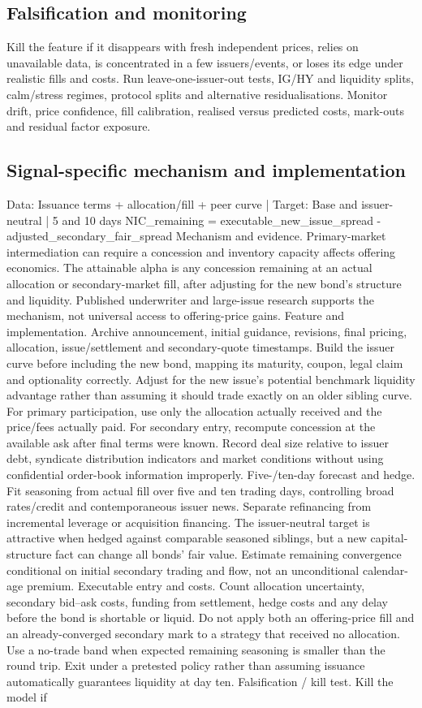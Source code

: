 \documentclass[10pt]{article}
\begin{document}
\subsection{Falsification and monitoring}
Kill the feature if it disappears with fresh independent prices, relies on unavailable data, is concentrated in a few issuers/events, or loses its edge under realistic fills and costs. Run leave-one-issuer-out tests, IG/HY and liquidity splits, calm/stress regimes, protocol splits and alternative residualisations. Monitor drift, price confidence, fill calibration, realised versus predicted costs, mark-outs and residual factor exposure.
\subsection{Signal-specific mechanism and implementation}
Data: Issuance terms + allocation/fill + peer curve  |  Target: Base and issuer-neutral  |  5 and 10 days NIC\_remaining = executable\_new\_issue\_spread - adjusted\_secondary\_fair\_spread Mechanism and evidence.  Primary-market intermediation can require a concession and inventory capacity affects offering economics. The attainable alpha is any concession remaining at an actual allocation or secondary-market fill, after adjusting for the new bond’s structure and liquidity. Published underwriter and large-issue research supports the mechanism, not universal access to offering-price gains. Feature and implementation.  Archive announcement, initial guidance, revisions, final pricing, allocation, issue/settlement and secondary-quote timestamps. Build the issuer curve before including the new bond, mapping its maturity, coupon, legal claim and optionality correctly. Adjust for the new issue’s potential benchmark liquidity advantage rather than assuming it should trade exactly on an older sibling curve. For primary participation, use only the allocation actually received and the price/fees actually paid. For secondary entry, recompute concession at the available ask after final terms were known. Record deal size relative to issuer debt, syndicate distribution indicators and market conditions without using confidential order-book information improperly. Five-/ten-day forecast and hedge.  Fit seasoning from actual fill over five and ten trading days, controlling broad rates/credit and contemporaneous issuer news. Separate refinancing from incremental leverage or acquisition financing. The issuer-neutral target is attractive when hedged against comparable seasoned siblings, but a new capital-structure fact can change all bonds’ fair value. Estimate remaining convergence conditional on initial secondary trading and flow, not an unconditional calendar-age premium. Executable entry and costs.  Count allocation uncertainty, secondary bid--ask costs, funding from settlement, hedge costs and any delay before the bond is shortable or liquid. Do not apply both an offering-price fill and an already-converged secondary mark to a strategy that received no allocation. Use a no-trade band when expected remaining seasoning is smaller than the round trip. Exit under a pretested policy rather than assuming issuance automatically guarantees liquidity at day ten. Falsification / kill test.  Kill the model if 
\end{document}
